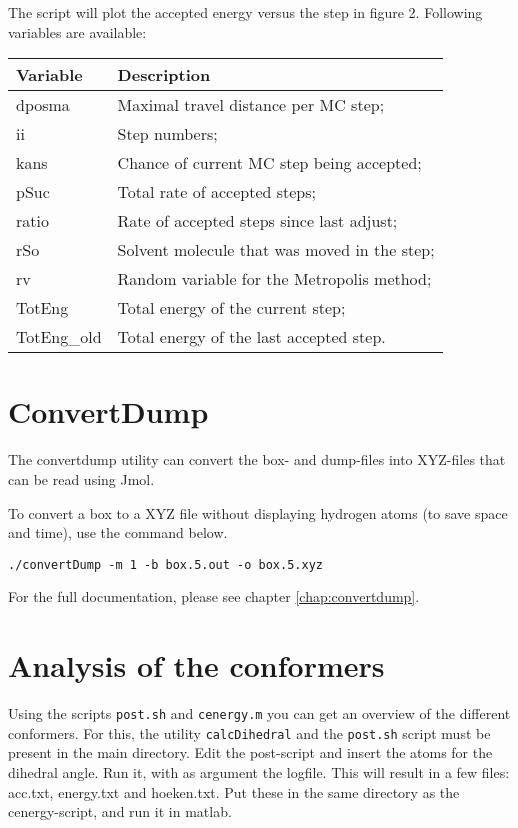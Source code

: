 The script will plot the accepted energy versus the step in figure 2. Following 
variables are available:

\begin{tabular}{ll}
	Variable & Description \\ \hline
	dposma & Maximal travel distance per MC step; \\
	ii & Step numbers; \\
	kans & Chance of current MC step being accepted; \\
	pSuc & Total rate of accepted steps; \\
	ratio & Rate of accepted steps since last adjust; \\
	rSo & Solvent molecule that was moved in the step; \\
	rv & Random variable for the Metropolis method; \\
	TotEng & Total energy of the current step; \\
	TotEng\_old & Total energy of the last accepted step. \\
\end{tabular}

\section{ConvertDump}
The convertdump utility can convert the box- and dump-files into XYZ-files that 
can be read using Jmol.

To convert a box to a XYZ file without displaying hydrogen atoms (to save space 
and time), use the command below.

\begin{lstlisting}[caption=Convert a box to a XYZ file]
./convertDump -m 1 -b box.5.out -o box.5.xyz
\end{lstlisting}

For the full documentation, please see chapter \ref{chap:convertdump}.

\section{Analysis of the conformers}
Using the scripts \verb|post.sh| and \verb|cenergy.m| you can get an overview 
of the different conformers. For this, the utility \verb|calcDihedral| and the 
\verb|post.sh| script must be present in the main directory. Edit the 
post-script and insert the atoms for the dihedral angle. Run it, with as 
argument the logfile. This will result in a few files: acc.txt, energy.txt and 
hoeken.txt. Put these in the same directory as the cenergy-script, and run it 
in matlab.